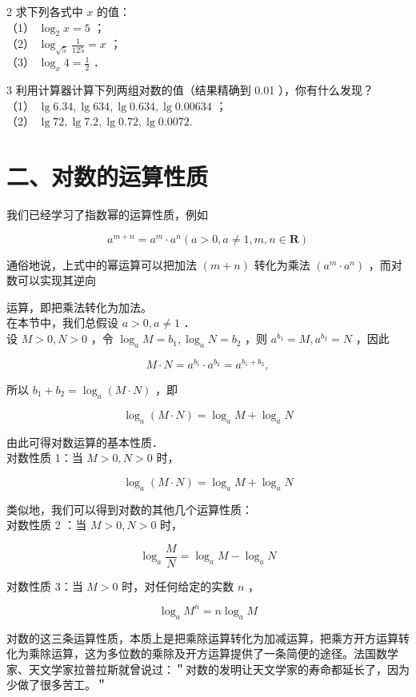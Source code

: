 \documentclass[10pt]{article}
\begin{document}
2 求下列各式中 \(x\) 的值：\\
（1） \(\log _{2} x=5\) ；\\
（2） \(\log _{\sqrt{5}} \frac{1}{125}=x\) ；\\
（3） \(\log _{x} 4=\frac{1}{2}\) ．

3 利用计算器计算下列两组对数的值（结果精确到 0.01 ），你有什么发现？\\
（1） \(\lg 6.34, \lg 634, \lg 0.634, \lg 0.00634\) ；\\
（2） \(\lg 72, \lg 7.2, \lg 0.72, \lg 0.0072\).

\section*{二、对数的运算性质}
我们已经学习了指数幂的运算性质，例如

\[
a^{m+n}=a^{m} \cdot a^{n}(a>0, a \neq 1, m, n \in \mathbf{R})
\]

通俗地说，上式中的幂运算可以把加法 \((m+n)\) 转化为乘法 \(\left(a^{m} \cdot a^{n}\right)\) ，而对数可以实现其逆向

运算，即把乘法转化为加法。\\
在本节中，我们总假设 \(a>0, a \neq 1\) ．\\
设 \(M>0, N>0\) ，令 \(\log _{a} M=b_{1}, \log _{a} N=b_{2}\) ，则 \(a^{b_{1}}=M, a^{b_{2}}=N\) ，因此

\[
M \cdot N=a^{b_{1}} \cdot a^{b_{2}}=a^{b_{1}+b_{2}},
\]

所以 \(b_{1}+b_{2}=\log _{a}(M \cdot N)\) ，即

\[
\log _{a}(M \cdot N)=\log _{a} M+\log _{a} N
\]

由此可得对数运算的基本性质．\\
对数性质 1：当 \(M>0, N>0\) 时，

\[
\log _{a}(M \cdot N)=\log _{a} M+\log _{a} N
\]

类似地，我们可以得到对数的其他几个运算性质：\\
对数性质 2 ：当 \(M>0, N>0\) 时，

\[
\log _{a} \frac{M}{N}=\log _{a} M-\log _{a} N
\]

对数性质 3：当 \(M>0\) 时，对任何给定的实数 \(n\) ，

\[
\log _{a} M^{n}=n \log _{a} M
\]

对数的这三条运算性质，本质上是把乘除运算转化为加减运算，把乘方开方运算转化为乘除运算，这为多位数的乘除及开方运算提供了一条简便的途径。法国数学家、天文学家拉普拉斯就曾说过：＂对数的发明让天文学家的寿命都延长了，因为少做了很多苦工。＂
\end{document}
